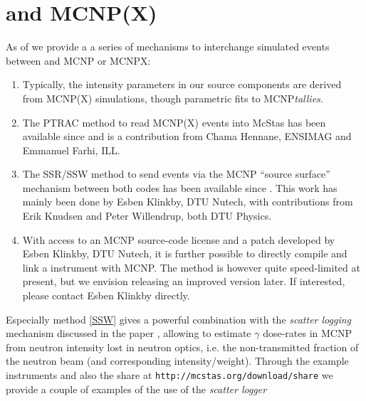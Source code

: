 \section{\MCS and MCNP(X)}

As of  we provide a a series of mechanisms to interchange simulated events
between \MCS and MCNP or MCNPX:
\begin{enumerate}
  \item Typically, the intensity parameters in our \MCS source components are
    derived from MCNP(X) simulations, though parametric fits to MCNP\emph{tallies}.
  \item The PTRAC method to read MCNP(X) events into McStas has been
    available since  and is a contribution from Chama
    Hennane, ENSIMAG and Emmanuel Farhi, ILL.
  \item The SSR/SSW method to send events via the MCNP ``source
    surface'' mechanism between both codes has been available since
    . This work has mainly been done by Esben Klinkby, DTU
    Nutech, with contributions from Erik Knudsen and Peter Willendrup,
    both DTU Physics. \label{SSW}
  \item With access to an MCNP source-code license and a patch
    developed by Esben Klinkby, DTU Nutech, it is further
    possible to directly compile and link a \MCS instrument with
    MCNP. The method is however quite speed-limited at present, but we
    envision releasing an improved version later. If interested,
    please contact Esben Klinkby directly.
\end{enumerate}
Especially method \ref{SSW} gives a powerful combination with the
\emph{scatter logging} mechanism discussed in the paper
\cite{BergbaeckKnudsen201420}, allowing to estimate $\gamma$ dose-rates
in MCNP from neutron intensity lost in neutron optics, i.e. the non-transmitted
fraction of the \MCS neutron beam (and corresponding
intensity/weight). Through the \MCS example instruments and also the \MCS share at
\verb+http://mcstas.org/download/share+ we provide a couple of
examples of the use of the \emph{scatter logger}
